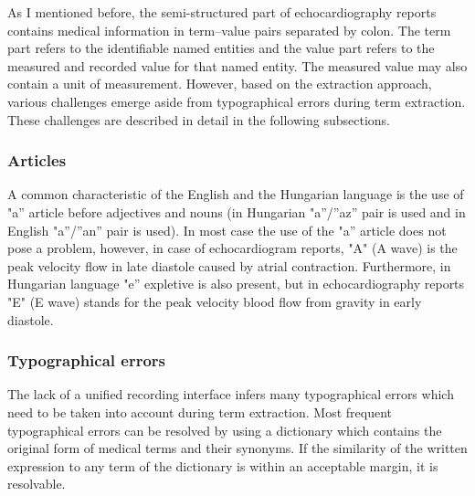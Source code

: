 
\vspace{1.0cm}

As I mentioned before, the semi-structured part of echocardiography reports contains medical information in term–value pairs separated by colon. The term part refers to the identifiable named entities and the value part refers to the measured and recorded value for that named entity. The measured value may also contain a unit of measurement. However, based on the extraction approach, various challenges emerge aside from typographical errors during term extraction. These challenges are described in detail in the following subsections.

\subsubsection*{Articles}

A common characteristic of the English and the Hungarian language is the use of "a” article before adjectives and nouns (in Hungarian "a”/”az” pair is used and in English "a”/”an” pair is used). In most case the use of the "a” article does not pose a problem, however, in case of echocardiogram reports, "A" (A wave) is the peak velocity flow in late diastole caused by atrial contraction. Furthermore, in Hungarian language "e” expletive is also present, but in echocardiography reports "E" (E wave) stands for the peak velocity blood flow from gravity in early diastole.

\subsubsection*{Typographical errors}

The lack of a unified recording interface infers many typographical errors which need to be taken into account during term extraction. Most frequent typographical errors can be resolved by using a dictionary which contains the original form of medical terms and their synonyms. If the similarity of the written expression to any term of the dictionary is within an acceptable margin, it is resolvable.

